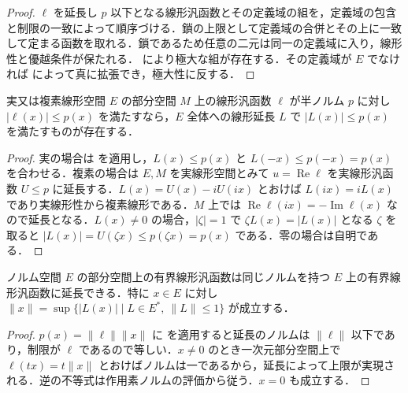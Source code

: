 \begin{proof}
$\ell$ を延長し $p$ 以下となる線形汎函数とその定義域の組を，定義域の包含と制限の一致によって順序づける．鎖の上限として定義域の合併とその上に一致して定まる函数を取れる．鎖であるため任意の二元は同一の定義域に入り，線形性と優越条件が保たれる． により極大な組が存在する．その定義域が $E$ でなければ  によって真に拡張でき，極大性に反する．
\end{proof}
\begin{prop}[半ノルムに支配された線形汎函数の延長]
実又は複素線形空間 $E$ の部分空間 $M$ 上の線形汎函数 $\ell$ が半ノルム $p$ に対し $|\ell(x)|\leq p(x)$ を満たすなら，$E$ 全体への線形延長 $L$ で $|L(x)|\leq p(x)$ を満たすものが存在する．
\end{prop}
\begin{proof}
実の場合は  を適用し，$L(x)\leq p(x)$ と $L(-x)\leq p(-x)=p(x)$ を合わせる．複素の場合は $E,M$ を実線形空間とみて $u=\operatorname{Re}\ell$ を実線形汎函数 $U\leq p$ に延長する．$L(x)=U(x)-iU(ix)$ とおけば $L(ix)=iL(x)$ であり実線形性から複素線形である．$M$ 上では $\operatorname{Re}\ell(ix)=-\operatorname{Im}\ell(x)$ なので延長となる．$L(x)\ne0$ の場合，$|\zeta|=1$ で $\zeta L(x)=|L(x)|$ となる $\zeta$ を取ると $|L(x)|=U(\zeta x)\leq p(\zeta x)=p(x)$ である．零の場合は自明である．
\end{proof}
\begin{prop}[ノルムを保つ延長と双対によるノルムの表示]
ノルム空間 $E$ の部分空間上の有界線形汎函数は同じノルムを持つ $E$ 上の有界線形汎函数に延長できる．特に $x\in E$ に対し $\|x\|=\sup\{|L(x)|\mid L\in E^*,\ \|L\|\leq1\}$ が成立する．
\end{prop}
\begin{proof}
$p(x)=\|\ell\|\|x\|$ に  を適用すると延長のノルムは $\|\ell\|$ 以下であり，制限が $\ell$ であるので等しい．$x\ne0$ のとき一次元部分空間上で $\ell(tx)=t\|x\|$ とおけばノルムは一であるから，延長によって上限が実現される．逆の不等式は作用素ノルムの評価から従う．$x=0$ も成立する．
\end{proof}
